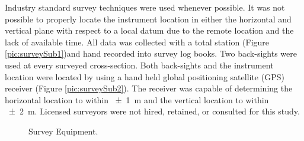 \begin{linenumbers}
Industry standard survey techniques were used whenever possible.  It was not possible to properly locate the instrument location in either the horizontal and vertical plane with respect to a local datum due to the remote location and the lack of available time.  All data was collected with a total station (Figure \ref{pic:surveySub1})and hand recorded into survey log books.  Two back-sights were used at every surveyed cross-section.  Both back-sights and the instrument location were located by using a hand held global positioning satellite (GPS) receiver (Figure \ref{pic:surveySub2}).  The receiver was capable of determining the horizontal location to within \SI{\pm 1}{\meter} and the vertical location to within \SI{\pm 2}{\meter}.  Licensed surveyors were not hired, retained, or consulted for this study.

\begin{figure}[htbp]
	\hspace{4em}%
	\caption[Survey Equipment.]{Survey Equipment.}
	\label{pic:surveyEquip}
\end{figure}


\end{linenumbers}
